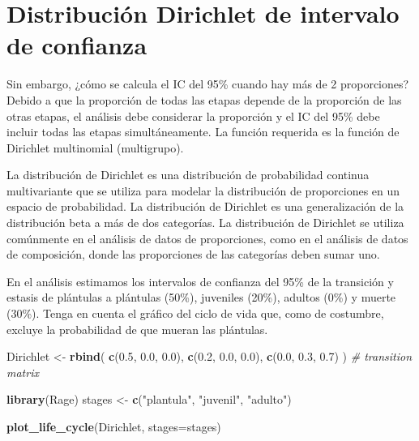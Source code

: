\documentclass[
]{book}
\newenvironment{Shaded}{\begin{snugshade}}{\end{snugshade}}
\newcommand{\AttributeTok}[1]{\textcolor[rgb]{0.13,0.29,0.53}{#1}}
\newcommand{\CommentTok}[1]{\textcolor[rgb]{0.56,0.35,0.01}{\textit{#1}}}
\newcommand{\FloatTok}[1]{\textcolor[rgb]{0.00,0.00,0.81}{#1}}
\newcommand{\FunctionTok}[1]{\textcolor[rgb]{0.13,0.29,0.53}{\textbf{#1}}}
\newcommand{\NormalTok}[1]{#1}
\newcommand{\OtherTok}[1]{\textcolor[rgb]{0.56,0.35,0.01}{#1}}
\newcommand{\StringTok}[1]{\textcolor[rgb]{0.31,0.60,0.02}{#1}}
\theoremstyle{definition}
\theoremstyle{definition}
\theoremstyle{definition}
\theoremstyle{definition}
\theoremstyle{remark}
\begin{document}
\section{Distribución Dirichlet de intervalo de confianza}\label{distribuciuxf3n-dirichlet-de-intervalo-de-confianza}

Sin embargo, ¿cómo se calcula el IC del 95\% cuando hay más de 2 proporciones? Debido a que la proporción de todas las etapas depende de la proporción de las otras etapas, el análisis debe considerar la proporción y el IC del 95\% debe incluir todas las etapas simultáneamente. La función requerida es la función de Dirichlet multinomial (multigrupo).

La distribución de Dirichlet es una distribución de probabilidad continua multivariante que se utiliza para modelar la distribución de proporciones en un espacio de probabilidad. La distribución de Dirichlet es una generalización de la distribución beta a más de dos categorías. La distribución de Dirichlet se utiliza comúnmente en el análisis de datos de proporciones, como en el análisis de datos de composición, donde las proporciones de las categorías deben sumar uno.

En el análisis estimamos los intervalos de confianza del 95\% de la transición y estasis de plántulas a plántulas (50\%), juveniles (20\%), adultos (0\%) y muerte (30\%). Tenga en cuenta el gráfico del ciclo de vida que, como de costumbre, excluye la probabilidad de que mueran las plántulas.

\begin{Shaded}
\begin{Highlighting}[]
\NormalTok{Dirichlet }\OtherTok{\textless{}{-}} \FunctionTok{rbind}\NormalTok{(}
  \FunctionTok{c}\NormalTok{(}\FloatTok{0.5}\NormalTok{, }\FloatTok{0.0}\NormalTok{, }\FloatTok{0.0}\NormalTok{),}
  \FunctionTok{c}\NormalTok{(}\FloatTok{0.2}\NormalTok{, }\FloatTok{0.0}\NormalTok{, }\FloatTok{0.0}\NormalTok{),}
  \FunctionTok{c}\NormalTok{(}\FloatTok{0.0}\NormalTok{, }\FloatTok{0.3}\NormalTok{, }\FloatTok{0.7}\NormalTok{)}
\NormalTok{) }\CommentTok{\# transition matrix}

\FunctionTok{library}\NormalTok{(Rage)}
\NormalTok{stages }\OtherTok{\textless{}{-}} \FunctionTok{c}\NormalTok{(}\StringTok{"plantula"}\NormalTok{, }\StringTok{"juvenil"}\NormalTok{, }\StringTok{"adulto"}\NormalTok{)}

\FunctionTok{plot\_life\_cycle}\NormalTok{(Dirichlet, }\AttributeTok{stages=}\NormalTok{stages)}
\end{Highlighting}
\end{Shaded}
\end{document}
